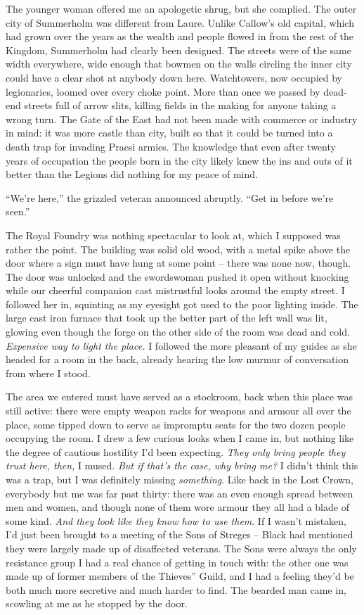 \documentclass[12pt, openany]{book}
\begin{document}
The younger woman offered me an apologetic shrug, but she complied. The outer city of Summerholm was different from Laure. Unlike Callow’s old capital, which had grown over the years as the wealth and people flowed in from the rest of the Kingdom, Summerholm had clearly been designed. The streets were of the same width everywhere, wide enough that bowmen on the walls circling the inner city could have a clear shot at anybody down here. Watchtowers, now occupied by legionaries, loomed over every choke point. More than once we passed by dead-end streets full of arrow slits, killing fields in the making for anyone taking a wrong turn. The Gate of the East had not been made with commerce or industry in mind: it was more castle than city, built so that it could be turned into a death trap for invading Praesi armies. The knowledge that even after twenty years of occupation the people born in the city likely knew the ins and outs of it better than the Legions did nothing for my peace of mind.

“We’re here,” the grizzled veteran announced abruptly. “Get in before we’re seen.”

The Royal Foundry was nothing spectacular to look at, which I supposed was rather the point. The building was solid old wood, with a metal spike above the door where a sign must have hung at some point – there was none now, though. The door was unlocked and the swordswoman pushed it open without knocking while our cheerful companion cast mistrustful looks around the empty street. I followed her in, squinting as my eyesight got used to the poor lighting inside. The large cast iron furnace that took up the better part of the left wall was lit, glowing even though the forge on the other side of the room was dead and cold. \textit{Expensive way to light the place.} I followed the more pleasant of my guides as she headed for a room in the back, already hearing the low murmur of conversation from where I stood.

The area we entered must have served as a stockroom, back when this place was still active: there were empty weapon racks for weapons and armour all over the place, some tipped down to serve as impromptu seats for the two dozen people occupying the room. I drew a few curious looks when I came in, but nothing like the degree of cautious hostility I’d been expecting. \textit{They only bring people they trust here, then,} I mused. \textit{But if that’s the case, why bring me?} I didn’t think this was a trap, but I was definitely missing \textit{something}. Like back in the Lost Crown, everybody but me was far past thirty: there was an even enough spread between men and women, and though none of them wore armour they all had a blade of some kind. \textit{And they look like they know how to use them}. If I wasn’t mistaken, I’d just been brought to a meeting of the Sons of Streges – Black had mentioned they were largely made up of disaffected veterans. The Sons were always the only resistance group I had a real chance of getting in touch with: the other one was made up of former members of the Thieves” Guild, and I had a feeling they’d be both much more secretive and much harder to find. The bearded man came in, scowling at me as he stopped by the door.
\end{document}
